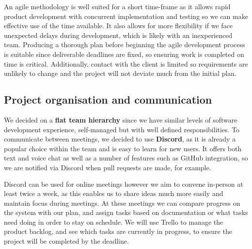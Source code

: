 \documentclass[10pt]{article}
\begin{document}
An agile methodology is well suited for a short time-frame \cite{agileSpeed} as
it allows rapid product development with concurrent implementation and testing
so we can make effective use of the time available. It also allows for more
flexibility if we face unexpected delays during development, which is likely
with an inexperienced team. Producing a thorough plan before beginning the agile
development process is suitable since deliverable deadlines are fixed, so
ensuring work is completed on time is critical. Additionally, contact with the
client is limited so requirements are unlikely to change and the project will
not deviate much from the initial plan.


\subsection{Project organisation and communication}
We decided on a \textbf{flat team hierarchy} since we have similar levels of
software development experience, self-managed but with well defined
responsibilities. To communicate between meetings, we decided to use
\textbf{Discord}, as it is already a popular choice within the team and is easy
to learn for new users. It offers both text and voice chat as well as a number
of features such as GitHub integration, so we are notified via Discord when pull
requests are made, for example.

Discord can be used for online meetings however we aim to convene in-person at
least twice a week, as this enables us to share ideas much more easily and
maintain focus during meetings. At these meetings we can compare progress on the
system with our plan, and assign tasks based on documentation or what tasks need
doing in order to stay on schedule. We will use Trello to manage the product
backlog, and see which tasks are currently in progress, to ensure the project
will be completed by the deadline.
\end{document}
